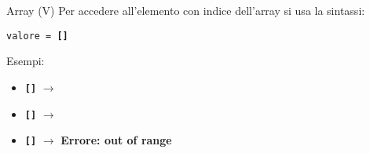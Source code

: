 \begin{frame}{Array (V)}
  Per accedere all'elemento con indice \texttt{} dell'array si usa la sintassi:
  \begin{center}
    \texttt{valore = \textbf{[}\textbf{]}}
  \end{center}
  
  Esempi:
  \begin{itemize}
   \item \texttt{\textbf{[}\textbf{]}} $\rightarrow$ 
   \item \texttt{\textbf{[}\textbf{]}} $\rightarrow$ 
   \item \texttt{\textbf{[}\textbf{]}} $\rightarrow$ \alert{\textbf{Errore: out of range}}
  \end{itemize}

\end{frame}

